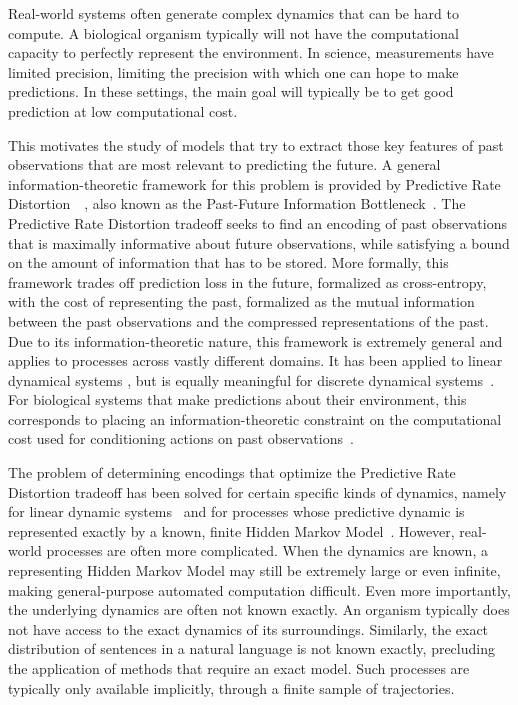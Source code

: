 \documentclass[11pt,letterpaper]{article}
\begin{document}
Real-world systems often generate complex dynamics that can be hard to compute.
A biological organism typically will not have the computational capacity to perfectly represent the environment.
In science, measurements have limited precision, limiting the precision with which one can hope to make predictions.
In these settings, the main goal will typically be to get good prediction at low computational cost.



This motivates the study of models that try to extract those key features of past observations that are most relevant to predicting the future.
A general information-theoretic framework for this problem is provided by Predictive Rate Distortion~~\citep{marzen-predictive-2016}, also known as the Past-Future Information Bottleneck~\citep{creutzig-past-future-2009}.
The Predictive Rate Distortion tradeoff seeks to find an encoding of past observations that is maximally informative about future observations, while satisfying a bound on the amount of information that has to be stored.
More formally, this framework trades off prediction loss in the future, formalized as cross-entropy, with the cost of representing the past, formalized as the mutual information between the past observations and the compressed representations of the past.
Due to its information-theoretic nature, this framework is extremely general and applies to processes across vastly different domains.
It has been applied to linear dynamical systems \citep{creutzig-past-future-2009,amir2015past}, but is equally meaningful for discrete dynamical systems~\citep{marzen-predictive-2016}.
For biological systems that make predictions about their environment, this corresponds to placing an information-theoretic constraint on the computational cost used for conditioning actions on past observations~\citep{genewein2015bounded}.

The problem of determining encodings that optimize the Predictive Rate Distortion tradeoff has been solved for certain specific kinds of dynamics, namely for linear dynamic systems~\citep{creutzig-past-future-2009} and for processes whose predictive dynamic is represented exactly by a known, finite Hidden Markov Model~\citep{marzen-predictive-2016}.
However, real-world processes are often more complicated.
When the dynamics are known, a representing Hidden Markov Model may still be extremely large or even infinite, making general-purpose automated computation difficult.
Even more importantly, the underlying dynamics are often not known exactly.
An organism typically does not have access to the exact dynamics of its surroundings.
Similarly, the exact distribution of sentences in a natural language is not known exactly, precluding the application of methods that require an exact model.
Such processes are typically only available implicitly, through a finite sample of trajectories.
\end{document}
